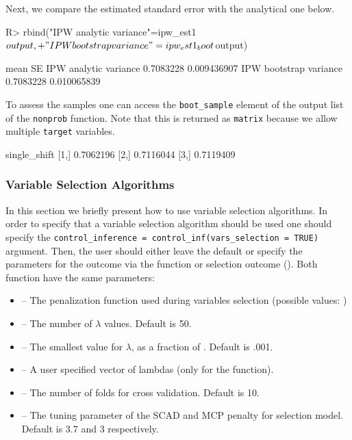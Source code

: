 \documentclass[
]{jss}
\begin{document}
Next, we compare the estimated standard error with the analytical one
below.

\begin{CodeChunk}
\begin{CodeInput}
R> rbind("IPW analytic variance"=ipw_est1$output,
+       "IPW bootstrap variance"=ipw_est1_boot$output)
\end{CodeInput}
\begin{CodeOutput}
                            mean          SE
IPW analytic variance  0.7083228 0.009436907
IPW bootstrap variance 0.7083228 0.010065839
\end{CodeOutput}
\end{CodeChunk}

To assess the samples one can access the \texttt{boot\_sample} element
of the output list of the \texttt{nonprob} function. Note that this is
returned as \texttt{matrix} because we allow multiple \texttt{target}
variables.

\begin{CodeChunk}
\begin{CodeOutput}
     single_shift
[1,]    0.7062196
[2,]    0.7116044
[3,]    0.7119409
\end{CodeOutput}
\end{CodeChunk}

\subsubsection{Variable Selection
Algorithms}\label{variable-selection-algorithms}

In this section we briefly present how to use variable selection
algorithms. In order to specify that a variable selection algorithm
should be used one should specify the
\texttt{control\_inference\ =\ control\_inf(vars\_selection\ =\ TRUE)}
argument. Then, the user should either leave the default or specify the
parameters for the outcome via the  function or
selection outcome (). Both function have the same
parameters:

\begin{itemize}
\item {} -- The penalization function used during variables selection (possible values: )
\item {} -- The number of $\lambda$ values. Default is 50.
\item {} -- The smallest value for $\lambda$, as a fraction of . Default is .001.
\item {} -- A user specified vector of lambdas (only for the  function).
\item {} -- The number of folds for cross validation. Default is 10.
\item {} -- The tuning parameter of the SCAD and MCP penalty for selection model. Default is 3.7 and 3 respectively.
\end{itemize}
\end{document}
